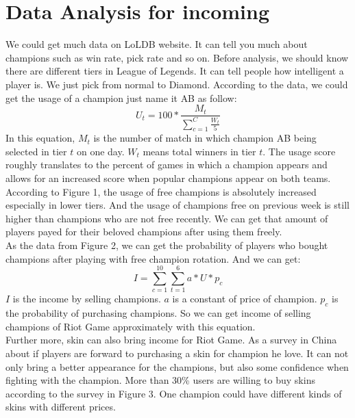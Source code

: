 \documentclass[sigconf]{acmart}
\begin{document}
\section{Data Analysis for incoming}
We could get much data on LoLDB website. It can tell you much about champions such as win rate, pick rate and so on. Before analysis, we should know there are different tiers in League of Legends. It can tell people how intelligent a player is. We just pick from normal to Diamond. According to the data, we could get the usage of a champion just name it AB as follow:\\
\begin{equation}
    U_t=100*\frac{M_t}{\sum_{c=1}^C\frac{W_t}{5}}
\end{equation}
In this equation, $M_t$ is the number of match in which champion AB being selected in tier $t$ on one day. $W_t$ means total winners in tier $t$. \cite{ccc} The usage score roughly translates to the percent of games in which a champion appears and allows for an increased score when popular champions appear on both teams.\cite{ddd} \\

According to Figure 1, the usage of free champions is absolutely increased especially in lower tiers. And the usage of champions free on previous week is still higher than champions who are not free recently. We can get that amount of players payed for their beloved champions after using them freely. \\

As the data from Figure 2, we can get the probability of players who bought champions after playing with free champion rotation. And we can get:\\
\begin{equation}
    I=\sum_{c=1}^{10}\sum_{t=1}^6a*U*p_c
\end{equation}
$I$ is the income by selling champions. $a$ is a constant of price of champion. $p_c$ is the probability of purchasing champions. So we can get income of selling champions of Riot Game approximately with this equation. \\
Further more, skin can also bring income for Riot Game. As a survey in China about if players are forward to purchasing a skin for champion he love. It can not only bring a better appearance for the champions, but also some confidence when fighting with the champion. More than 30\% users are willing to buy skins according to the survey in Figure 3. One champion could have different kinds of skins with different prices. \\
\end{document}
